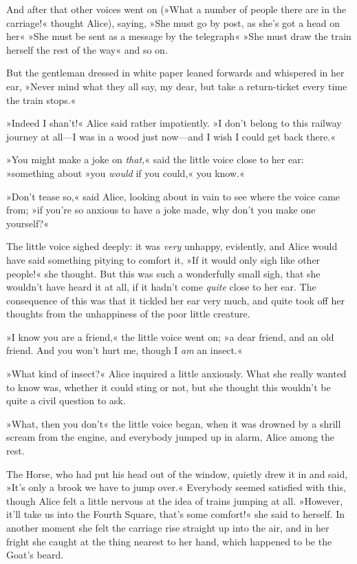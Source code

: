 And after that other voices went on (»What a number of people there are in the carriage!« thought Alice), saying, »She must go by post, as she's got a head on her\longdash« »She must be sent as a message by the telegraph\longdash« »She must draw the train herself the rest of the way\longdash« and so on.

But the gentleman dressed in white paper leaned forwards and whispered in her ear, »Never mind what they all say, my dear, but take a return-ticket every time the train stops.«

»Indeed I shan't!« Alice said rather impatiently. »I don't belong to this railway journey at all—I was in a wood just now—and I wish I could get back there.«

»You might make a joke on \textit{that,}« said the little voice close to her ear: »something about »you \textit{would} if you could,« you know.«

»Don't tease so,« said Alice, looking about in vain to see where the voice came from; »if you're so anxious to have a joke made, why don't you make one yourself?«

The little voice sighed deeply: it was \textit{very} unhappy, evidently, and Alice would have said something pitying to comfort it, »If it would only sigh like other people!« she thought. But this was such a wonderfully small sigh, that she wouldn't have heard it at all, if it hadn't come \textit{quite} close to her ear. The consequence of this was that it tickled her ear very much, and quite took off her thoughts from the unhappiness of the poor little creature.

»I know you are a friend,« the little voice went on; »a dear friend, and an old friend. And you won't hurt me, though I \textit{am} an insect.«

»What kind of insect?« Alice inquired a little anxiously. What she really wanted to know was, whether it could sting or not, but she thought this wouldn't be quite a civil question to ask.

»What, then you don't\longdash« the little voice began, when it was drowned by a shrill scream from the engine, and everybody jumped up in alarm, Alice among the rest.

The Horse, who had put his head out of the window, quietly drew it in and said, »It's only a brook we have to jump over.« Everybody seemed satisfied with this, though Alice felt a little nervous at the idea of trains jumping at all. »However, it'll take us into the Fourth Square, that's some comfort!« she said to herself. In another moment she felt the carriage rise straight up into the air, and in her fright she caught at the thing nearest to her hand, which happened to be the Goat's beard.

